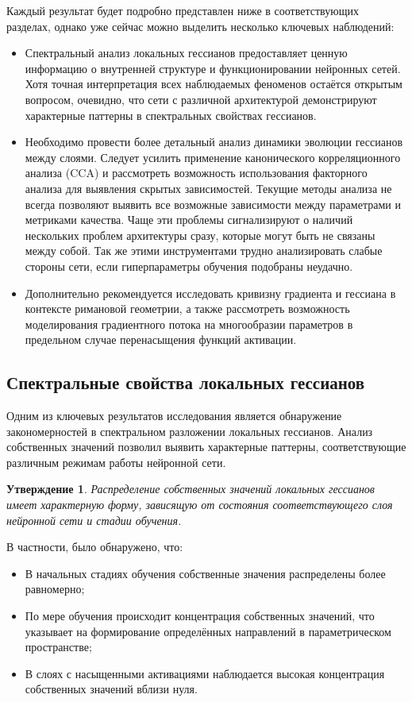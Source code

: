 \documentclass[a4paper,12pt]{article}
\newtheorem{proposition}{Утверждение}
\begin{document}
Каждый результат будет подробно представлен ниже в соответствующих разделах, однако уже сейчас можно выделить
несколько ключевых наблюдений:
\begin{itemize}
  \item Спектральный анализ локальных гессианов предоставляет ценную информацию о внутренней структуре и
    функционировании нейронных сетей. Хотя точная интерпретация всех наблюдаемых феноменов остаётся открытым
    вопросом, очевидно, что сети с различной архитектурой демонстрируют характерные паттерны в спектральных
    свойствах гессианов.
  \item Необходимо провести более детальный анализ динамики эволюции гессианов между слоями. Следует усилить
    применение канонического корреляционного анализа (CCA) и рассмотреть возможность использования факторного
    анализа для выявления скрытых зависимостей. Текущие методы анализа не всегда позволяют выявить все
    возможные зависимости между параметрами и метриками качества. Чаще эти проблемы сигнализируют о наличий
    нескольких проблем архитектуры сразу, которые могут быть не связаны между собой. Так же этими
    инструментами трудно анализировать слабые стороны сети, если гиперпараметры обучения подобраны неудачно.
  \item Дополнительно рекомендуется исследовать кривизну градиента и гессиана в контексте римановой
    геометрии, а также рассмотреть возможность моделирования градиентного потока на многообразии параметров в
    предельном случае перенасыщения функций активации.
\end{itemize}

\subsection{Спектральные свойства локальных гессианов}
Одним из ключевых результатов исследования является обнаружение закономерностей в спектральном разложении
локальных гессианов. Анализ собственных значений позволил выявить характерные паттерны, соответствующие
различным режимам работы нейронной сети.

\begin{proposition}
  Распределение собственных значений локальных гессианов имеет характерную форму, зависящую от состояния
  соответствующего слоя нейронной сети и стадии обучения.
\end{proposition}

В частности, было обнаружено, что:
\begin{itemize}
  \item В начальных стадиях обучения собственные значения распределены более равномерно;
  \item По мере обучения происходит концентрация собственных значений, что указывает на формирование
    определённых направлений в параметрическом пространстве;
  \item В слоях с насыщенными активациями наблюдается высокая концентрация собственных значений вблизи нуля.
\end{itemize}
\end{document}
